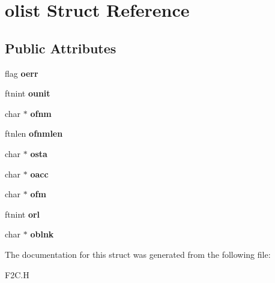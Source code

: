\hypertarget{structolist}{\section{olist Struct Reference}
\label{structolist}
}
\subsection*{Public Attributes}
\begin{DoxyCompactItemize}
\item 
\hypertarget{structolist_acb7f3c45380f7965c9ab177c228ed936}{flag {\bfseries oerr}}\label{structolist_acb7f3c45380f7965c9ab177c228ed936}

\item 
\hypertarget{structolist_af4443a6a577bfe9292cbf741c24c6e79}{ftnint {\bfseries ounit}}\label{structolist_af4443a6a577bfe9292cbf741c24c6e79}

\item 
\hypertarget{structolist_a6af6060865be898dfc66c0fd6630d545}{char $\ast$ {\bfseries ofnm}}\label{structolist_a6af6060865be898dfc66c0fd6630d545}

\item 
\hypertarget{structolist_a497ca7ef9c2e42d5cd30c847fdbd3f10}{ftnlen {\bfseries ofnmlen}}\label{structolist_a497ca7ef9c2e42d5cd30c847fdbd3f10}

\item 
\hypertarget{structolist_a2cf08ac4e1e2fc9e6f21299df3f1d2e6}{char $\ast$ {\bfseries osta}}\label{structolist_a2cf08ac4e1e2fc9e6f21299df3f1d2e6}

\item 
\hypertarget{structolist_ad27927ac817bff0dbfa00d07f3e3e2d2}{char $\ast$ {\bfseries oacc}}\label{structolist_ad27927ac817bff0dbfa00d07f3e3e2d2}

\item 
\hypertarget{structolist_abe3c8fd2be6dc58be3157e2e0f48cf6a}{char $\ast$ {\bfseries ofm}}\label{structolist_abe3c8fd2be6dc58be3157e2e0f48cf6a}

\item 
\hypertarget{structolist_a4c83b168f7afdd6c81a7843193c5755e}{ftnint {\bfseries orl}}\label{structolist_a4c83b168f7afdd6c81a7843193c5755e}

\item 
\hypertarget{structolist_a6b914b4f6d4df1f377d40c964bd71625}{char $\ast$ {\bfseries oblnk}}\label{structolist_a6b914b4f6d4df1f377d40c964bd71625}

\end{DoxyCompactItemize}


The documentation for this struct was generated from the following file\+:\begin{DoxyCompactItemize}
\item 
F2\+C.\+H\end{DoxyCompactItemize}
